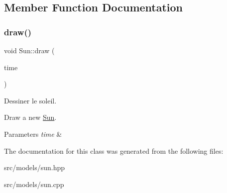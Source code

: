 \subsection{Member Function Documentation}
\mbox{\label{classSun_a1338daf4028ea9b7526553488c0961e0}} 
\subsubsection{\texorpdfstring{draw()}{draw()}}
{\footnotesize\ttfamily void Sun\+::draw (\begin{DoxyParamCaption}\item[{G\+Luint}]{time }\end{DoxyParamCaption})}



Dessiner le soleil. 

Draw a new \mbox{\hyperlink{classSun}{Sun}}.


\begin{DoxyParams}{Parameters}
{\em time} & \\
\hline
\end{DoxyParams}


The documentation for this class was generated from the following files\+:\begin{DoxyCompactItemize}
\item 
src/models/sun.\+hpp\item 
src/models/sun.\+cpp\end{DoxyCompactItemize}

